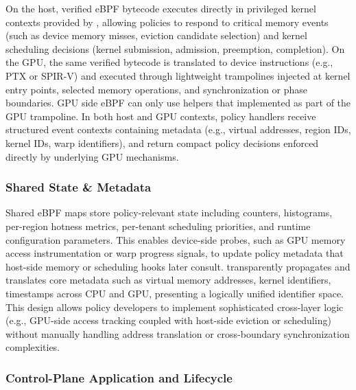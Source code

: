 On the host, verified eBPF bytecode executes directly in privileged kernel contexts provided by \sysdriver, allowing policies to respond to critical memory events (such as device memory misses, eviction candidate selection) and kernel scheduling decisions (kernel submission, admission, preemption, completion). On the GPU, the same verified bytecode is translated to device instructions (e.g., PTX or SPIR-V) and executed through lightweight trampolines injected at kernel entry points, selected memory operations, and synchronization or phase boundaries. GPU side eBPF can only use helpers that implemented as part of the GPU trampoline. In both host and GPU contexts, policy handlers receive structured event contexts containing metadata (e.g., virtual addresses, region IDs, kernel IDs, warp identifiers), and return compact policy decisions enforced directly by underlying GPU mechanisms.

\subsubsection{Shared State \& Metadata}

Shared eBPF maps store policy-relevant state including counters, histograms, per-region hotness metrics, per-tenant scheduling priorities, and runtime configuration parameters. This enables device-side probes, such as GPU memory access instrumentation or warp progress signals, to update policy metadata that host-side memory or scheduling hooks later consult. \sys transparently propagates and translates core metadata such as virtual memory addresses, kernel identifiers, timestamps across CPU and GPU, presenting a logically unified identifier space. This design allows policy developers to implement sophisticated cross-layer logic (e.g., GPU-side access tracking coupled with host-side eviction or scheduling) without manually handling address translation or cross-boundary synchronization complexities.

\subsubsection{Control-Plane Application and Lifecycle}

